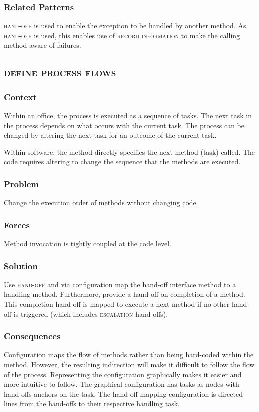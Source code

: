 \documentclass[prodmode]{style/acmlarge}
\begin{document}
\subsubsection*{Related Patterns} \textsc{hand-off} is used to enable the
exception to be handled by another method.  As \textsc{hand-off} is used, this
enables use of \textsc{record information} to make the calling method aware of
failures.



\subsection{\textsc{\textbf{define process flows}}}

\subsubsection*{Context} Within an office, the process is executed as a sequence
of tasks.  The next task in the process depends on what occurs with the current
task.  The process can be changed by altering the next task for an outcome of
the current task.

Within software, the method directly specifies the next method (task) called. 
The code requires altering to change the sequence that the methods are executed.

\subsubsection*{\textbf{Problem}} Change the execution order of methods without
changing code.

\subsubsection*{Forces} Method invocation is tightly coupled at the code level.

\subsubsection*{\textbf{Solution}} Use \textsc{hand-off} and via configuration
map the hand-off interface method to a handling method.  Furthermore, provide a
hand-off on completion of a method.  This completion hand-off is mapped to
execute a next method if no other hand-off is triggered (which includes
\textsc{escalation} hand-offs).

\subsubsection*{Consequences} Configuration maps the flow of methods rather than
being hard-coded within the method.  However, the resulting indirection will
make it difficult to follow the flow of the process.  Representing the
configuration graphically makes it easier and more intuitive to follow.  The
graphical configuration has tasks as nodes with hand-offs anchors on the task. 
The hand-off mapping configuration is directed lines from the hand-offs to their
respective handling task.
\end{document}

